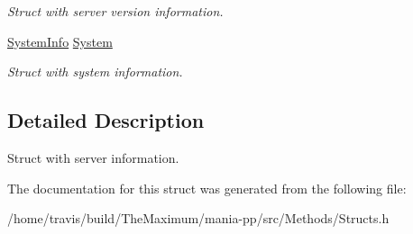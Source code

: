 \begin{DoxyCompactItemize}
\begin{DoxyCompactList}\small\item\em Struct with server version information. \end{DoxyCompactList}\item 
\hypertarget{structServerInfo_a97727217c6b07430e5d377668567f623}{\hyperlink{structSystemInfo}{System\-Info} \hyperlink{structServerInfo_a97727217c6b07430e5d377668567f623}{System}}\label{structServerInfo_a97727217c6b07430e5d377668567f623}

\begin{DoxyCompactList}\small\item\em Struct with system information. \end{DoxyCompactList}\end{DoxyCompactItemize}


\subsection{Detailed Description}
Struct with server information. 

The documentation for this struct was generated from the following file\-:\begin{DoxyCompactItemize}
\item 
/home/travis/build/\-The\-Maximum/mania-\/pp/src/\-Methods/Structs.\-h\end{DoxyCompactItemize}
